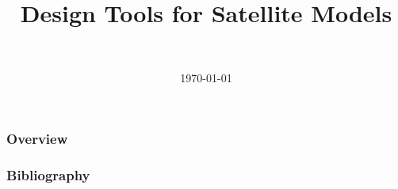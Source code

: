 \documentclass[]{beamer}
\title[Design Tools for Satellite Models]{Design Tools for Satellite Models}
\author[Daniel Topa]{\TopaHII \\ \TopaHIIEmail}
\institute{\missiontech}
\date{\today}
\begin{document}
\begin{frame}
	\titlepage
\end{frame}

\begin{frame}\frametitle{Overview}
	\tableofcontents[hideallsubsections]
\end{frame}

	
	
	
	

{\tiny{
\begin{frame}[allowframebreaks]\frametitle{Bibliography}
	\printbibliography
\end{frame}}}

\begin{frame}
	\titlepage
\end{frame}
\end{document}
